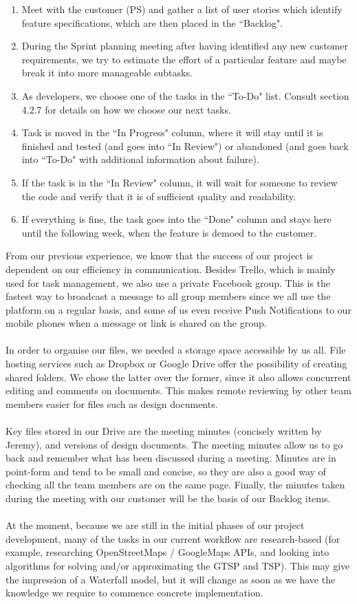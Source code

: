 \documentclass[10pt]{article}
\begin{document}
\begin{enumerate}
\item Meet with the customer (PS) and gather a list of user stories which identify feature specifications, which are then placed in the ``Backlog".
\item During the Sprint planning meeting after having identified any new customer requirements, we try to estimate the effort of a particular feature and maybe break it into more manageable subtasks.
\item As developers, we choose one of the tasks in the ``To-Do" list. Consult section 4.2.7 for details on how we choose our next tasks.
\item Task is moved in the ``In Progress" column, where it will stay until it is finished and tested (and goes into ``In Review") or abandoned (and goes back into ``To-Do" with additional information about failure).
\item If the task is in the ``In Review" column, it will wait for someone to review the code and verify that it is of sufficient quality and readability.
\item If everything is fine, the task goes into the ``Done" column and stays here until the following week, when the feature is demoed to the customer.
\end{enumerate}
From our previous experience, we know that the success of our project is dependent on our efficiency in communication. Besides Trello, which is mainly used for task management, we also use a private Facebook group. This is the fastest way to broadcast a message to all group members since we all use the platform on a regular basis, and some of us even receive Push Notifications to our mobile phones when a message or link is shared on the group. \\\\
In order to organise our files, we needed a storage space accessible by us all. File hosting services such as Dropbox or Google Drive offer the possibility of creating shared folders. We chose the latter over the former, since it also allows concurrent editing and comments on documents. This makes remote reviewing by other team members easier for files such as design documents.\\\\
Key files stored in our Drive are the meeting minutes (concisely written by Jeremy), and versions of design documents. The meeting minutes allow us to go back and remember what has been discussed during a meeting. Minutes are in point-form and tend to be small and concise, so they are also a good way of checking all the team members are on the same page. Finally, the minutes taken during the meeting with our customer will be the basis of our Backlog items.\\\\
At the moment, because we are still in the initial phases of our project development, many of the tasks in our current workflow are research-based (for example, researching OpenStreetMaps / GoogleMaps APIs, and looking into algorithms for solving and/or approximating the GTSP and TSP). This may give the impression of a Waterfall model, but it will change as soon as we have the knowledge we require to commence concrete implementation.
\end{document}
